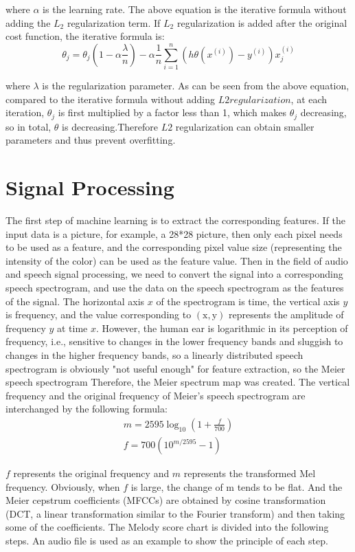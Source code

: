where $\alpha$ is the learning rate. The above equation is the iterative formula without adding the $L_{2}$ regularization term. If $L_{2}$ regularization is added after the original cost function, the iterative formula is:
$$
\theta_{j}=\theta_{j}\left(1-\alpha \frac{\lambda}{n}\right)-\alpha \frac{1}{n} \sum_{i=1}^{n}\left(h \theta\left(x^{(i)}\right)-y^{(i)}\right) x_{j}^{(i)}
$$

where $\lambda$ is the regularization parameter. As can be seen from the above equation, compared to the iterative formula without adding $L2 regularization$, at each iteration, $\theta_{j}$ is first multiplied by a factor less than 1, which makes $\theta_{j}$ decreasing, so in total, $\theta$ is decreasing.Therefore $L2$ regularization can obtain smaller parameters and thus prevent overfitting.

\section{Signal Processing}

The first step of machine learning is to extract the corresponding features. If the input data is a picture, for example, a 28*28 picture, then only each pixel needs to be used as a feature, and the corresponding pixel value size (representing the intensity of the color) can be used as the feature value. Then in the field of audio and speech signal processing, we need to convert the signal into a corresponding speech spectrogram, and use the data on the speech spectrogram as the features of the signal. The horizontal axis $x$ of the spectrogram is time, the vertical axis $y$ is frequency, and the value corresponding to $(\mathrm{x}, \mathrm{y})$ represents the amplitude of frequency $y$ at time $x$. However, the human ear is logarithmic in its perception of frequency, i.e., sensitive to changes in the lower frequency bands and sluggish to changes in the higher frequency bands, so a linearly distributed speech spectrogram is obviously "not useful enough" for feature extraction, so the Meier speech spectrogram Therefore, the Meier spectrum map was created. The vertical frequency and the original frequency of Meier's speech spectrogram are interchanged by the following formula:
$$
\begin{gathered}
	m=2595 \log _{10}\left(1+\frac{f}{700}\right) \\
	f=700\left(10^{m / 2595}-1\right)
\end{gathered}
$$

$f$ represents the original frequency and $m$ represents the transformed Mel frequency. Obviously, when $f$ is large, the change of m tends to be flat. And the Meier cepstrum coefficients (MFCCs) are obtained by cosine transformation (DCT, a linear transformation similar to the Fourier transform) and then taking some of the coefficients.
The Melody score chart is divided into the following steps. An audio file is used as an example to show the principle of each step.

